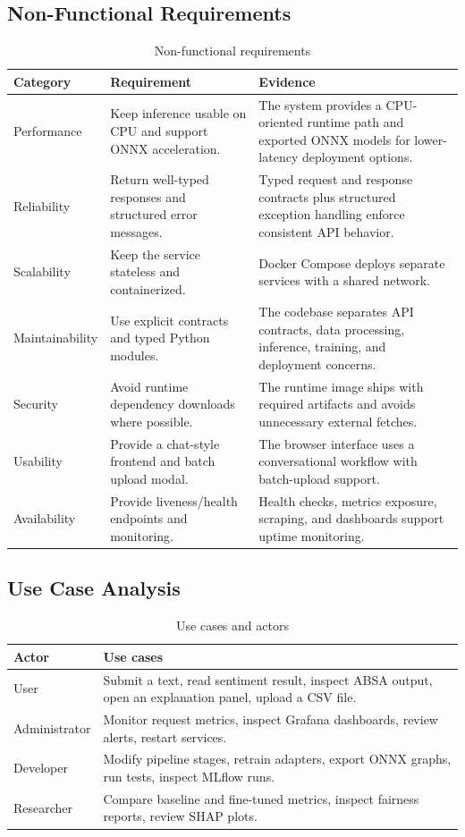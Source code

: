 \documentclass[12pt, a4paper]{article}
\begin{document}
\subsection{Non-Functional Requirements}
\begin{table}[H]
\centering
\caption{Non-functional requirements}
\begin{tabularx}{\textwidth}{@{} p{2.6cm} p{3cm} X @{}}
\toprule
\textbf{Category} & \textbf{Requirement} & \textbf{Evidence} \\
\midrule
Performance & Keep inference usable on CPU and support ONNX acceleration. & The system provides a CPU-oriented runtime path and exported ONNX models for lower-latency deployment options. \\
Reliability & Return well-typed responses and structured error messages. & Typed request and response contracts plus structured exception handling enforce consistent API behavior. \\
Scalability & Keep the service stateless and containerized. & Docker Compose deploys separate services with a shared network. \\
Maintainability & Use explicit contracts and typed Python modules. & The codebase separates API contracts, data processing, inference, training, and deployment concerns. \\
Security & Avoid runtime dependency downloads where possible. & The runtime image ships with required artifacts and avoids unnecessary external fetches. \\
Usability & Provide a chat-style frontend and batch upload modal. & The browser interface uses a conversational workflow with batch-upload support. \\
Availability & Provide liveness/health endpoints and monitoring. & Health checks, metrics exposure, scraping, and dashboards support uptime monitoring. \\
\bottomrule
\end{tabularx}
\end{table}

\subsection{Use Case Analysis}
\begin{table}[H]
\centering
\caption{Use cases and actors}
\begin{tabularx}{\textwidth}{@{} p{3cm} X @{}}
\toprule
\textbf{Actor} & \textbf{Use cases} \\
\midrule
User & Submit a text, read sentiment result, inspect ABSA output, open an explanation panel, upload a CSV file. \\
Administrator & Monitor request metrics, inspect Grafana dashboards, review alerts, restart services. \\
Developer & Modify pipeline stages, retrain adapters, export ONNX graphs, run tests, inspect MLflow runs. \\
Researcher & Compare baseline and fine-tuned metrics, inspect fairness reports, review SHAP plots. \\
\bottomrule
\end{tabularx}
\end{table}
\end{document}
